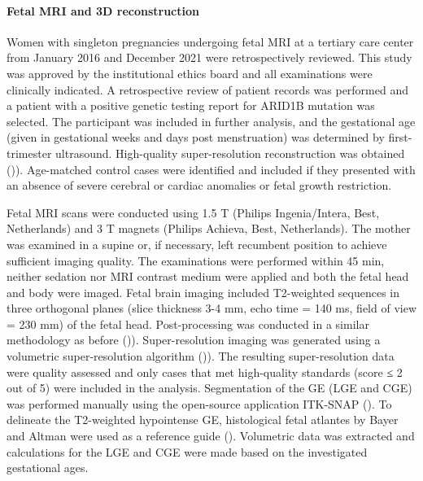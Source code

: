\paragraph{Fetal MRI and 3D reconstruction}
Women with singleton pregnancies undergoing fetal MRI at a tertiary care center from January 2016 and December 2021 were retrospectively reviewed. This study was approved by the institutional ethics board and all examinations were clinically indicated. A retrospective review of patient records was performed and a patient with a positive genetic testing report for ARID1B mutation was selected. The participant was included in further analysis, and the gestational age (given in gestational weeks and days post menstruation) was determined by first-trimester ultrasound. High-quality super-resolution reconstruction was obtained (\cite{hao_integrated_2021})). Age-matched control cases were identified and included if they presented with an absence of severe cerebral or cardiac anomalies or fetal growth restriction. 

Fetal MRI scans were conducted using 1.5 T (Philips Ingenia/Intera, Best, Netherlands) and 3 T magnets (Philips Achieva, Best, Netherlands). The mother was examined in a supine or, if necessary, left recumbent position to achieve sufficient imaging quality. The examinations were performed within 45 min, neither sedation nor MRI contrast medium were applied and both the fetal head and body were imaged. Fetal brain imaging included T2-weighted sequences in three orthogonal planes (slice thickness 3-4 mm, echo time = 140 ms, field of view = 230 mm) of the fetal head. Post-processing was conducted in a similar methodology as before (\cite{gholipour_normative_2017,schwartz_prenatal_2021})). Super-resolution imaging was generated using a volumetric super-resolution algorithm (\cite{ebner_automated_2020})). The resulting super-resolution data were quality assessed and only cases that met high-quality standards (score ≤ 2 out of 5) were included in the analysis. Segmentation of the GE (LGE and CGE) was performed manually using the open-source application ITK-SNAP (\cite{ebner_automated_2020}). To delineate the T2-weighted hypointense GE, histological fetal atlantes by Bayer and Altman were used as a reference guide (\cite{yushkevich_user-guided_2006,bayer_atlas_2003,bayer_human_2005}). Volumetric data was extracted and calculations for the LGE and CGE were made based on the investigated gestational ages.



\clearpage

